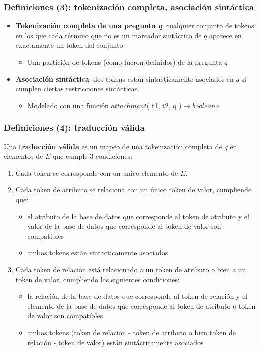 \begin{frame}
\frametitle{Definiciones (3): tokenización completa, asociación sintáctica}

  \begin{itemize}
    \item \textbf{Tokenización completa de una pregunta \textit{q}}:  cualquier conjunto de tokens en los que cada término que no es un marcador sintáctico de $q$ aparece en exactamente un token del conjunto.
    \begin{itemize}
      \item Una partición de tokens (como fueron definidos) de la pregunta $q$
    \end{itemize} 
    \item \textbf{Asociación sintáctica}: dos tokens están sintácticamente asociados en $q$ si cumplen ciertas restricciones sintácticas.
    \begin{itemize}
      \item Modelado con una función $attachment($ t1, t2, q $) \rightarrow booleano$
    \end{itemize} 
   \end{itemize}
\end{frame}

\fontsize{9.5pt}{7.2}\selectfont
\begin{frame}[<+->]
\frametitle{Definiciones (4): traducción válida}
 Una \textbf{traducción válida} es un mapeo de una tokenización completa de $q$ en elementos de $E$ que cumple 3 condiciones:
\begin{enumerate}
  \item Cada token se corresponde con un único elemento de $E$.
  \item Cada token de atributo se relaciona con un único token de valor, cumpliendo que:
  \begin{itemize}
    \fontsize{9.5pt}{7.2}\selectfont
    \item el atributo de la base de datos que corresponde al token de atributo y el valor de la base de datos que corresponde al token de valor son compatibles
    \item ambos tokens están sintácticamente asociados
   \end{itemize}
  \item Cada token de relación está relacionado a un token de atributo o bien a un token de valor, cumpliendo las siguientes condiciones:

  \begin{itemize}
    \fontsize{9.5pt}{7.2}\selectfont
    \item la relación de la base de datos que corresponde al token de relación y el elemento de la base de datos que corresponde al token de atributo o token de valor son compatibles
    \item ambos tokens (token de relación - token de atributo o bien token de relación - token de valor) están sintácticamente asociados
  \end{itemize}
\end{enumerate}
\end{frame}

